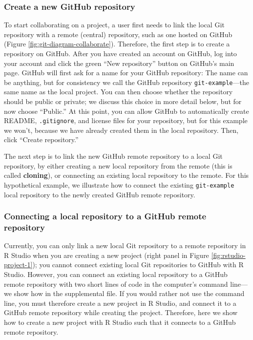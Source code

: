 \documentclass[
  american,
  ,doc,floatsintext]{apa6}
\begin{document}
\hypertarget{create-a-new-github-repository}{%
\subsubsection{Create a new GitHub repository}\label{create-a-new-github-repository}}

To start collaborating on a project, a user first needs to link the local Git repository with a remote (central) repository, such as one hosted on GitHub (Figure \ref{fig:git-diagram-collaborate}). Therefore, the first step is to create a repository on GitHub. After you have created an account on GitHub, log into your account and click the green ``New repository'' button on GitHub's main page. GitHub will first ask for a name for your GitHub repository: The name can be anything, but for consistency we call the GitHub repository \texttt{git-example}---the same name as the local project. You can then choose whether the repository should be public or private; we discuss this choice in more detail below, but for now choose ``Public.'' At this point, you can allow GitHub to automatically create README, \texttt{.gitignore}, and license files for your repository, but for this example we won't, because we have already created them in the local repository. Then, click ``Create repository.''

The next step is to link the new GitHub remote repository to a local Git repository, by either creating a new local repository from the remote (this is called \textbf{cloning}), or connecting an existing local repository to the remote. For this hypothetical example, we illustrate how to connect the existing \texttt{git-example} local repository to the newly created GitHub remote repository.

\hypertarget{connecting-a-local-repository-to-a-github-remote-repository}{%
\subsubsection{Connecting a local repository to a GitHub remote repository}\label{connecting-a-local-repository-to-a-github-remote-repository}}

Currently, you can only link a new local Git repository to a remote repository in R Studio when you are creating a new project (right panel in Figure \ref{fig:rstudio-project-1}); you cannot connect existing local Git repositories to GitHub with R Studio. However, you can connect an existing local repository to a GitHub remote repository with two short lines of code in the computer's command line---we show how in the supplemental file. If you would rather not use the command line, you must therefore create a new project in R Studio, and connect it to a GitHub remote repository while creating the project. Therefore, here we show how to create a new project with R Studio such that it connects to a GitHub remote repository.
\end{document}
